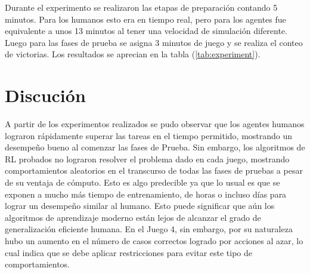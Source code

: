 Durante el experimento se realizaron las etapas de preparación contando 5 minutos. Para los humanos esto era en tiempo real, pero para los agentes fue equivalente a unos 13 minutos al tener una velocidad de simulación diferente. Luego para las fases de prueba se asigna 3 minutos de juego y se realiza el conteo de victorias. Los resultados se aprecian en la tabla (\ref{tab:experiment}).
 
\begin{table}[ht!]
    \centering
    \caption{Resultado del experimento en la fase de Prueba. Total de juegos completados correctamente durante 3 minutos.}
    \label{tab:experiment}
\end{table}
 
\section{Discución}
 
A partir de los experimentos realizados se pudo observar que los agentes humanos lograron rápidamente superar las tareas en el tiempo permitido, mostrando un desempeño bueno al comenzar las fases de Prueba. Sin embargo, los algoritmos de RL probados no lograron resolver el problema dado en cada juego, mostrando comportamientos aleatorios en el transcurso de todas las fases de pruebas a pesar de su ventaja de cómputo. Esto es algo predecible ya que lo usual es que se exponen a mucho más tiempo de entrenamiento, de horas o incluso días para lograr un desempeño similar al humano. Esto puede significar que aún los algoritmos de aprendizaje moderno están lejos de alcanzar el grado de generalización eficiente humana. En el Juego 4, sin embargo, por su naturaleza hubo un aumento en el número de casos correctos logrado por acciones al azar, lo cual indica que se debe aplicar restricciones para evitar este tipo de comportamientos.

